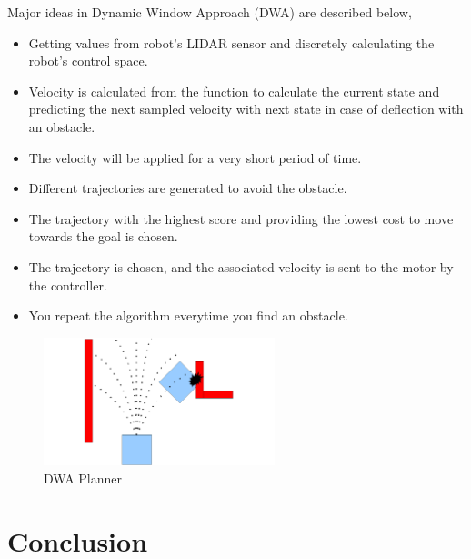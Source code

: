 Major ideas in Dynamic Window Approach (DWA) are described below,
\begin{itemize}
    \item Getting values from robot's LIDAR sensor and discretely calculating the robot's control space.
    \item Velocity is calculated from the function to calculate the current state and predicting the next sampled velocity with next state in case of deflection with an obstacle.
    \item The velocity will be applied for a very short period of time.
    \item Different trajectories are generated to avoid the obstacle.
    \item The trajectory with the highest score and providing the lowest cost to move towards the goal is chosen.
    \item The trajectory is chosen, and the associated velocity is sent to the motor by the controller. 
    \item You repeat the algorithm everytime you find an obstacle. 
\end{itemize}

\begin{figure}[th]
    \centering
    \includegraphics[width=0.6\textwidth]{Figures/dwa_planner.png}
    \decoRule
    \caption[]{DWA Planner}
    \label{fig:DWAPlanner}

\end{figure}

\section{Conclusion}


